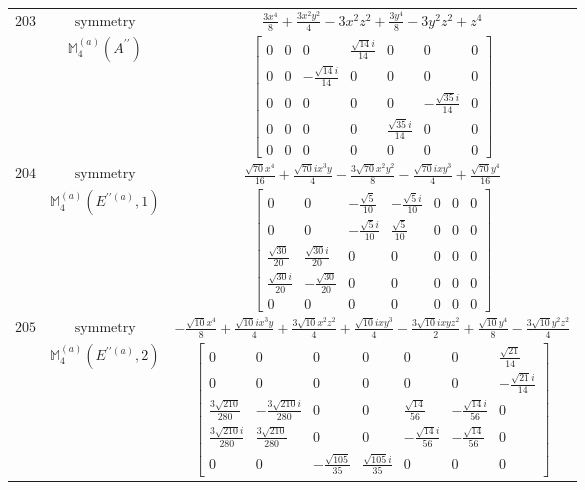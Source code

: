 \documentclass[fleqn,8pt,landscape]{jsarticle}
\begin{document}
\begin{longtable}{ccc}
$ 203 $ & $ \text{symmetry} $ & $ \frac{3 x^{4}}{8} + \frac{3 x^{2} y^{2}}{4} - 3 x^{2} z^{2} + \frac{3 y^{4}}{8} - 3 y^{2} z^{2} + z^{4} $ \\
$  $ & $ \mathbb{M}_{4}^{(a)}(A^{\prime\prime}) $ & $ \begin{bmatrix} 0 & 0 & 0 & \frac{\sqrt{14} i}{14} & 0 & 0 & 0 \\ 0 & 0 & - \frac{\sqrt{14} i}{14} & 0 & 0 & 0 & 0 \\ 0 & 0 & 0 & 0 & 0 & - \frac{\sqrt{35} i}{14} & 0 \\ 0 & 0 & 0 & 0 & \frac{\sqrt{35} i}{14} & 0 & 0 \\ 0 & 0 & 0 & 0 & 0 & 0 & 0 \end{bmatrix} $ \\ \hline
$ 204 $ & $ \text{symmetry} $ & $ \frac{\sqrt{70} x^{4}}{16} + \frac{\sqrt{70} i x^{3} y}{4} - \frac{3 \sqrt{70} x^{2} y^{2}}{8} - \frac{\sqrt{70} i x y^{3}}{4} + \frac{\sqrt{70} y^{4}}{16} $ \\
$  $ & $ \mathbb{M}_{4}^{(a)}(E^{\prime\prime(a)},1) $ & $ \begin{bmatrix} 0 & 0 & - \frac{\sqrt{5}}{10} & - \frac{\sqrt{5} i}{10} & 0 & 0 & 0 \\ 0 & 0 & - \frac{\sqrt{5} i}{10} & \frac{\sqrt{5}}{10} & 0 & 0 & 0 \\ \frac{\sqrt{30}}{20} & \frac{\sqrt{30} i}{20} & 0 & 0 & 0 & 0 & 0 \\ \frac{\sqrt{30} i}{20} & - \frac{\sqrt{30}}{20} & 0 & 0 & 0 & 0 & 0 \\ 0 & 0 & 0 & 0 & 0 & 0 & 0 \end{bmatrix} $ \\ \hline
$ 205 $ & $ \text{symmetry} $ & $ - \frac{\sqrt{10} x^{4}}{8} + \frac{\sqrt{10} i x^{3} y}{4} + \frac{3 \sqrt{10} x^{2} z^{2}}{4} + \frac{\sqrt{10} i x y^{3}}{4} - \frac{3 \sqrt{10} i x y z^{2}}{2} + \frac{\sqrt{10} y^{4}}{8} - \frac{3 \sqrt{10} y^{2} z^{2}}{4} $ \\
$  $ & $ \mathbb{M}_{4}^{(a)}(E^{\prime\prime(a)},2) $ & $ \begin{bmatrix} 0 & 0 & 0 & 0 & 0 & 0 & \frac{\sqrt{21}}{14} \\ 0 & 0 & 0 & 0 & 0 & 0 & - \frac{\sqrt{21} i}{14} \\ \frac{3 \sqrt{210}}{280} & - \frac{3 \sqrt{210} i}{280} & 0 & 0 & \frac{\sqrt{14}}{56} & - \frac{\sqrt{14} i}{56} & 0 \\ \frac{3 \sqrt{210} i}{280} & \frac{3 \sqrt{210}}{280} & 0 & 0 & - \frac{\sqrt{14} i}{56} & - \frac{\sqrt{14}}{56} & 0 \\ 0 & 0 & - \frac{\sqrt{105}}{35} & \frac{\sqrt{105} i}{35} & 0 & 0 & 0 \end{bmatrix} $ \\ \hline

\end{longtable}
\end{document}
